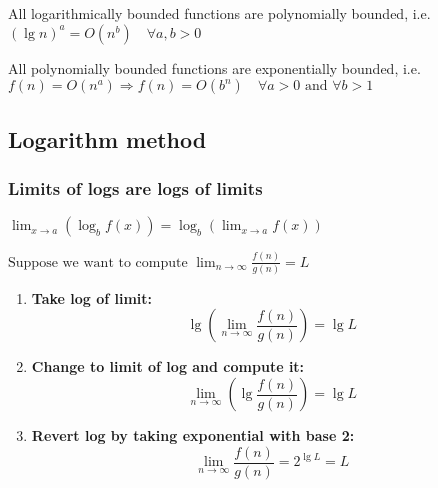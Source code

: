 \documentclass{article}
\begin{document}
\begin{theorem}
    All logarithmically bounded functions are polynomially bounded, i.e. \((\lg n)^a = O(n^b) \quad \forall a, b > 0\)
\end{theorem}

\begin{theorem}
    All polynomially bounded functions are exponentially bounded, i.e. \( f(n) = O(n^a) \Rightarrow f(n) = O(b^n) \quad \forall a > 0 \text{ and } \forall b > 1\)
\end{theorem}

\subsection{Logarithm method}
\subsubsection{Limits of logs are logs of limits}
\begin{definition}
    $\lim_{x \to a} (\log_b f(x)) = \log_b \left( \lim_{x \to a} f(x) \right)$
\end{definition}

\begin{process}
    $\text{Suppose we want to compute } \lim_{n \to \infty} \frac{f(n)}{g(n)} = L$
    \begin{enumerate}
        \item \textbf{Take log of limit:}
        \begin{equation*}
            \lg \left( \lim_{n \to \infty} \frac{f(n)}{g(n)} \right) = \lg L
        \end{equation*}
        \item \textbf{Change to limit of log and compute it:}
        \begin{equation*}
            \lim_{n \to \infty} \left( \lg \frac{f(n)}{g(n)} \right) = \lg L 
        \end{equation*}
        \item \textbf{Revert log by taking exponential with base 2:}
        \begin{equation*}
            \lim_{n \to \infty} \frac{f(n)}{g(n)} = 2^{\lg L} = L
        \end{equation*}
    \end{enumerate}
\end{process}

\begin{process}
    
\end{process}
\end{document}

